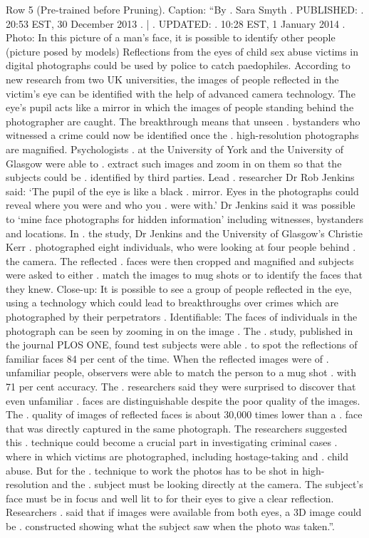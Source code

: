 \begin{table}[H]
\centering
\caption{Row 5 (Pre-trained before Pruning). \ifshowcaption{}Caption: ``By . Sara Smyth . PUBLISHED: . 20:53 EST, 30 December 2013 . | . UPDATED: . 10:28 EST, 1 January 2014 . Photo: In this picture of a man's face, it is possible to identify other people (picture posed by models) Reflections from the eyes of child sex abuse victims in digital photographs could be used by police to catch paedophiles. According to new research from two UK universities, the images of people reflected in the victim's eye can be identified with the help of advanced camera technology. The eye's pupil acts like a mirror in which the images of people standing behind the photographer are caught. The breakthrough means that unseen . bystanders who witnessed a crime could now be identified once the . high-resolution photographs are magnified. Psychologists . at the University of York and the University of Glasgow were able to . extract such images and zoom in on them so that the subjects could be . identified by third parties. Lead . researcher Dr Rob Jenkins said: ‘The pupil of the eye is like a black . mirror. Eyes in the photographs could reveal where you were and who you . were with.' Dr Jenkins said it was possible to ‘mine face photographs for hidden information' including witnesses, bystanders and locations. In . the study, Dr Jenkins and the University of Glasgow's Christie Kerr . photographed eight individuals, who were looking at four people behind . the camera. The reflected . faces were then cropped and magnified and subjects were asked to either . match the images to mug shots or to identify the faces that they knew. Close-up: It is possible to see a group of people reflected in the eye, using a technology which could lead to breakthroughs over crimes which are photographed by their perpetrators . Identifiable: The faces of individuals in the photograph can be seen by zooming in on the image . The . study, published in the journal PLOS ONE, found test subjects were able . to spot the reflections of familiar faces 84 per cent of the time. When the reflected images were of . unfamiliar people, observers were able to match the person to a mug shot . with 71 per cent accuracy. The . researchers said they were surprised to discover that even unfamiliar . faces are distinguishable despite the poor quality of the images. The . quality of images of reflected faces is about 30,000 times lower than a . face that was directly captured in the same photograph. The researchers suggested this . technique could become a crucial part in investigating criminal cases . where in which victims are photographed, including hostage-taking and . child abuse. But for the . technique to work the photos has to be shot in high-resolution and the . subject must be looking directly at the camera. The subject's face must be in focus and well lit to for their eyes to give a clear reflection. Researchers . said that if images were available from both eyes, a 3D image could be . constructed showing what the subject saw when the photo was taken.''.\fi}

\end{table}
